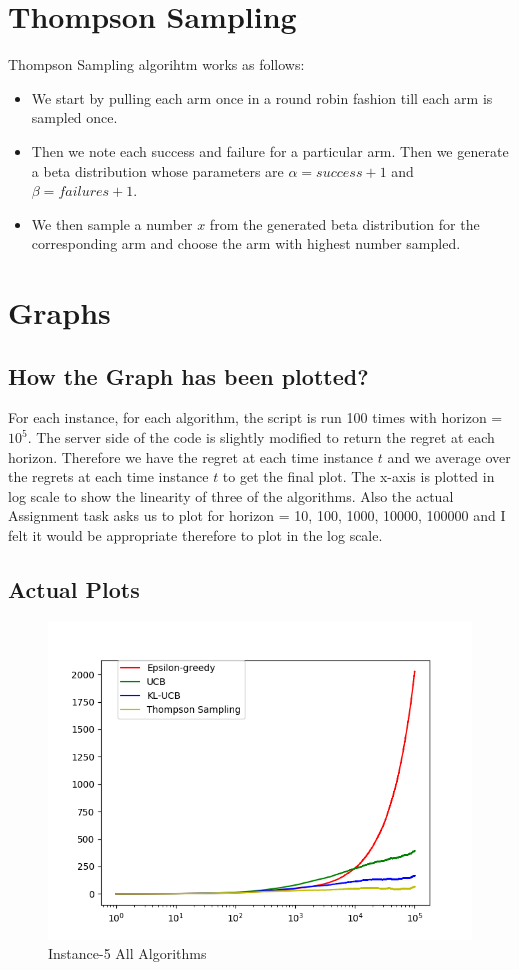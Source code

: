 \documentclass{article}
\begin{document}
\section{Thompson Sampling}
Thompson Sampling algorihtm works as follows:
\begin{itemize}
\item We start by pulling each arm once in a round robin fashion till each arm is sampled once.
\item Then we note each success and failure for a particular arm. Then we generate a beta distribution whose parameters are $\alpha = success + 1$ and $\beta = failures + 1$.
\item We then sample a number $x$ from the generated beta distribution for the corresponding arm and choose the arm with highest number sampled.
\end{itemize}

\section{Graphs}
\subsection{How the Graph has been plotted?}
For each instance, for each algorithm, the script is run 100 times with horizon = $10^5$. The server side of the code is slightly modified to return the regret at each horizon. Therefore we have the regret at each time instance $t$ and we average over the regrets at each time instance $t$ to get the final plot. The x-axis is plotted in log scale to show the linearity of three of the algorithms. Also the actual Assignment task asks us to plot for horizon = {10, 100, 1000, 10000, 100000} and I felt it would be appropriate therefore to plot in the log scale.

\subsection{Actual Plots}
\begin{figure}[H]
  \centering
  \includegraphics[scale=1]{images/Instance-5}
  \caption{Instance-5 All Algorithms}
  \label{fig:inst5_plot}
\end{figure}
\end{document}
